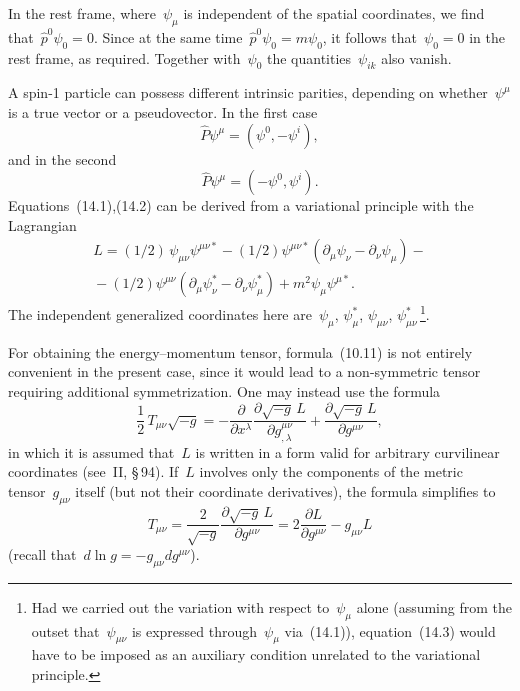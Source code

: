 In the rest frame, where~$\psi_\mu$ is independent of the spatial coordinates, we find that~$\hat{p}^0\psi_0 = 0$. Since at the same time~$\hat{p}^0\psi_0 = m\psi_0$, it follows that~$\psi_0 = 0$ in the rest frame, as required. Together with~$\psi_0$ the quantities~$\psi_{ik}$ also vanish.

A spin-1 particle can possess different intrinsic parities, depending on whether~$\psi^\mu$ is a true vector or a pseudovector. In the first case
\[
\hat{P}\psi^\mu = \left(\psi^0, -\psi^i\right),
\]
and in the second
\[
\hat{P}\psi^\mu = \left(-\psi^0, \psi^i\right).
\]
Equations~(14.1),(14.2) can be derived from a variational principle with the Lagrangian
\begin{multline}
L = (1/2)\,\psi_{\mu\nu}\psi^{\mu\nu*} - (1/2)\psi^{\mu\nu*}(\partial_\mu\psi_\nu - \partial_\nu\psi_\mu) -{}\\
{}- (1/2)\psi^{\mu\nu}(\partial_\mu\psi^*_\nu - \partial_\nu\psi^*_\mu) + m^2\psi_\mu\psi^{\mu*}.
\tag{14.5}
\end{multline}
The independent generalized coordinates here are~$\psi_\mu$, $\psi^*_\mu$, $\psi_{\mu\nu}$, $\psi^*_{\mu\nu}$\,\footnote{Had we carried out the variation with respect to~$\psi_\mu$ alone (assuming from the outset that~$\psi_{\mu\nu}$ is expressed through~$\psi_\mu$ via~(14.1)), equation~(14.3) would have to be imposed as an auxiliary condition unrelated to the variational principle.}.

For obtaining the energy--momentum tensor, formula~(10.11) is not entirely convenient in the present case, since it would lead to a non-symmetric tensor requiring additional symmetrization. One may instead use the formula
\begin{equation}
\frac{1}{2}\,T_{\mu\nu}\sqrt{-g} = -\frac{\partial}{\partial x^\lambda}\frac{\partial\sqrt{-g}\,L}{\partial g^{\mu\nu}_{,\lambda}} + \frac{\partial\sqrt{-g}\,L}{\partial g^{\mu\nu}},
\tag{14.6}
\end{equation}
in which it is assumed that~$L$ is written in a form valid for arbitrary curvilinear coordinates (see~II, \S\,94). If~$L$ involves only the components of the metric tensor~$g_{\mu\nu}$ itself (but not their coordinate derivatives), the formula simplifies to
\[
T_{\mu\nu} = \frac{2}{\sqrt{-g}}\frac{\partial\sqrt{-g}\,L}{\partial g^{\mu\nu}} = 2\frac{\partial L}{\partial g^{\mu\nu}} - g_{\mu\nu}L
\]
(recall that~$d\ln g = -g_{\mu\nu}dg^{\mu\nu}$).

